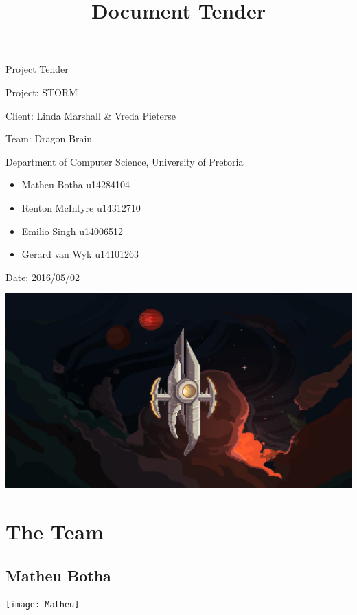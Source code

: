 \documentclass[12pt]{article}
\begin{document}
\title{Document Tender}

\begin{titlepage}
\begin{huge}
\begin{center}
Project Tender

Project: STORM
\\
\begin{LARGE}
Client: Linda Marshall \& Vreda Pieterse
\end{LARGE}

Team: Dragon Brain
\\
\begin{small}
Department of Computer Science, University of Pretoria
\\
\begin{itemize}
\item Matheu Botha u14284104
\item Renton McIntyre u14312710
\item Emilio Singh u14006512
\item Gerard van Wyk u14101263
\end{itemize}


Date: 2016/05/02

\end{small}

\includegraphics[scale=0.2]{test}
\end{center}

\end{huge}


\end{titlepage}

\pagebreak

\section{The Team}
\subsection{Matheu Botha}
\texttt{[image: Matheu]}
\end{document}
